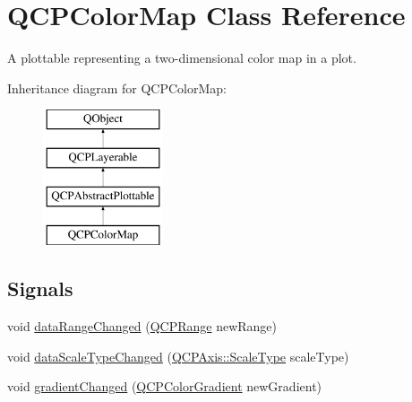 \hypertarget{class_q_c_p_color_map}{}\section{Q\+C\+P\+Color\+Map Class Reference}
\label{class_q_c_p_color_map}


A plottable representing a two-\/dimensional color map in a plot.  


Inheritance diagram for Q\+C\+P\+Color\+Map\+:\begin{figure}[H]
\begin{center}
\leavevmode
\includegraphics[height=4.000000cm]{class_q_c_p_color_map}
\end{center}
\end{figure}
\subsection*{Signals}
\begin{DoxyCompactItemize}
\item 
void \hyperlink{class_q_c_p_color_map_a482980f2335d09cfb36dd95ba9663197}{data\+Range\+Changed} (\hyperlink{class_q_c_p_range}{Q\+C\+P\+Range} new\+Range)
\item 
void \hyperlink{class_q_c_p_color_map_a978d5d5c9f68cffef8c902b855c04490}{data\+Scale\+Type\+Changed} (\hyperlink{class_q_c_p_axis_a36d8e8658dbaa179bf2aeb973db2d6f0}{Q\+C\+P\+Axis\+::\+Scale\+Type} scale\+Type)
\item 
void \hyperlink{class_q_c_p_color_map_abf4797f86e422ac6e0f732c4ff1a4d49}{gradient\+Changed} (\hyperlink{class_q_c_p_color_gradient}{Q\+C\+P\+Color\+Gradient} new\+Gradient)
\end{DoxyCompactItemize}
